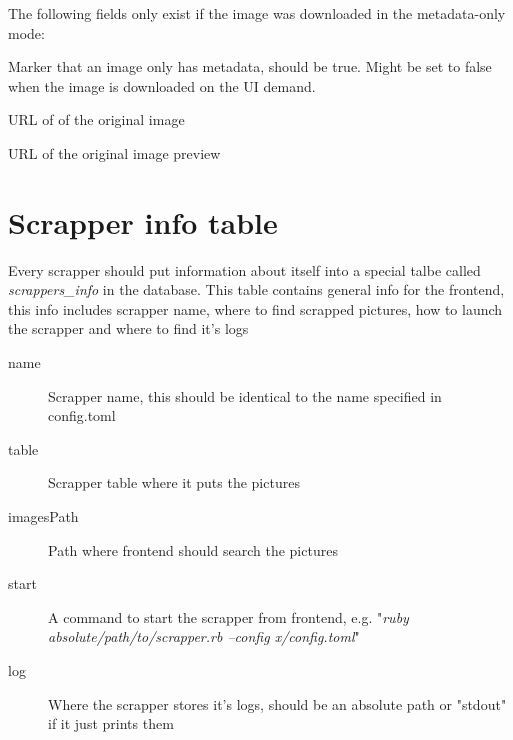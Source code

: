 \documentclass{article}
\begin{document}
The following fields only exist if the image was
downloaded in the metadata-only mode:

\begin{description}
\item [metedataOnly] Marker that an image only has metadata, should be true.
  Might be set to false when the image is downloaded on the UI demand.
\item [originalImage] URL of of the original image
\item [orignalThumbnail] URL of the original image preview
\item
\end{description}

\pagebreak

\section{Scrapper info table}

Every scrapper should put information about itself into a special talbe
called \textit{scrappers\_info} in the database. This table contains general
info for the frontend, this info includes scrapper name,
where to find scrapped pictures, how to launch the scrapper and where to find it's logs

\begin{description}
\item [name] Scrapper name, this should be identical to the name specified in config.toml
\item [table] Scrapper table where it puts the pictures
\item [imagesPath] Path where frontend should search the pictures
\item [start] A command to start the scrapper from frontend, e.g. "\textit{ruby absolute/path/to/scrapper.rb --config x/config.toml}"
\item [log] Where the scrapper stores it's logs, should be an absolute path or "stdout" if it just prints them
\end{description}
\end{document}
